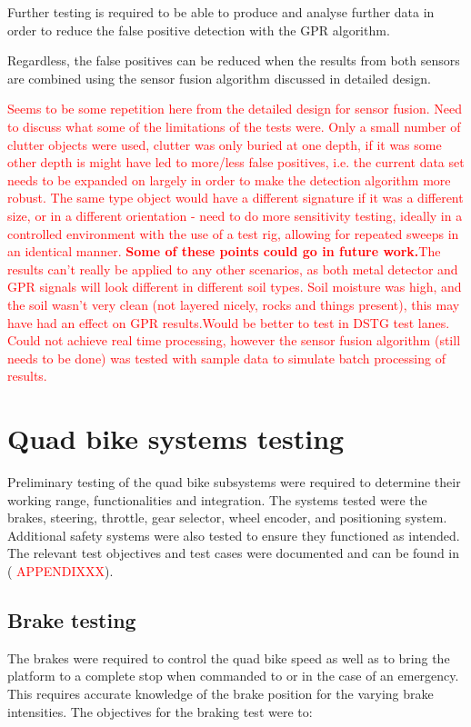 \documentclass[main.tex]{subfiles}
\begin{document}
Further testing is required to be able to produce and analyse further data in order to reduce the false positive detection with the GPR algorithm. 

Regardless, the false positives can be reduced when the results from both sensors are combined using the sensor fusion algorithm discussed in detailed design.



\textcolor{red}{Seems to be some repetition here from the detailed design for sensor fusion. Need to discuss what some of the limitations of the tests were. Only a small number of clutter objects were used, clutter was only buried at one depth, if it was some other depth is might have led to more/less false positives, i.e. the current data set needs to be expanded on largely in order to make the detection algorithm more robust. The same type object would have a different signature if it was a different size, or in a different orientation - need to do more sensitivity testing, ideally in a controlled environment with the use of a test rig, allowing for repeated sweeps in an identical manner. \textbf{Some of these points could go in future work.}The results can't really be applied to any other scenarios, as both metal detector and GPR signals will look different in different soil types. Soil moisture was high, and the soil wasn't very clean (not layered nicely, rocks and things present), this may have had an effect on GPR results.Would be better to test in DSTG test lanes. Could not achieve real time processing, however the sensor fusion algorithm (still needs to be done) was tested with sample data to simulate batch processing of results.}

\section{Quad bike systems testing}
Preliminary testing of the quad bike subsystems were required to determine their working range, functionalities and integration. The systems tested were the brakes, steering, throttle, gear selector, wheel encoder, and positioning system. Additional safety systems were also tested to ensure they functioned as intended.
The relevant test objectives and test cases were documented and can be found in (\textcolor{red}{ APPENDIXXX}).

\subsection{Brake testing}
The brakes were required to control the quad bike speed as well as to bring the platform to a complete stop when commanded to or in the case of an emergency. This requires accurate knowledge of the brake position for the varying brake intensities. The objectives for the braking test were to:
\end{document}
